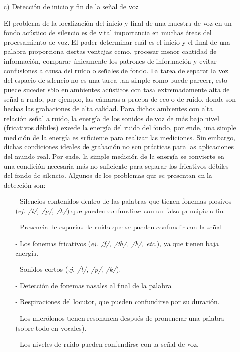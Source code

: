 \begin{enumerate}
\item[c)]Detección de inicio y fin de la señal de voz
\par
El problema de la localización del inicio y final de una muestra de voz en un fondo acústico de silencio es de vital importancia en muchas áreas del procesamiento de voz. El poder determinar cuál es el inicio y el final de una palabra proporciona ciertas ventajas como, procesar menor cantidad de información, comparar únicamente los patrones de información y evitar confusiones a causa del ruido o señales de fondo.
\vskip 0.5cm
La tarea de separar la voz del espacio de silencio no es una tarea tan simple como puede parecer, esto puede suceder sólo en ambientes acústicos con tasa extremadamente alta de señal a ruido, por ejemplo, las cámaras a prueba de eco o de ruido, donde son hechas las grabaciones de alta calidad. Para dichos ambientes con alta relación señal a ruido, la energía de los sonidos de voz de más bajo nivel (fricativos débiles) excede la energía del ruido del fondo, por ende, una simple medición de la energía es suficiente para realizar las mediciones. 
\vskip 0.5cm
Sin embargo, dichas condiciones ideales de grabación no son prácticas para las aplicaciones del mundo real. Por ende, la simple medición de la energía se convierte en una condición necesaria más no suficiente para separar los fricativos débiles del fondo de silencio.
\vskip 0.5cm
Algunos de los problemas que se presentan en la detección son:
\begin{enumerate}
\item[-]Silencios contenidos dentro de las palabras que tienen fonemas plosivos (\textit{ej. /t/, /p/, /k/}) que pueden confundirse con un falso principio o fin. 
\item[-]Presencia de espurias de ruido que se pueden confundir con la señal. 
\item[-]Los fonemas fricativos (\textit{ej. /f/, /th/, /h/, etc.}), ya que tienen baja energía.
\item[-]Sonidos cortos (\textit{ej. /t/, /p/, /k/}).
\item[-]Detección de fonemas nasales al final de la palabra.
\item[-]Respiraciones del locutor, que pueden confundirse por su duración.
\item[-]Los micrófonos tienen resonancia después de pronunciar una palabra (sobre todo en vocales).
\item[-]Los niveles de ruido pueden confundirse con la señal de voz.
\end{enumerate}


\end{enumerate}

